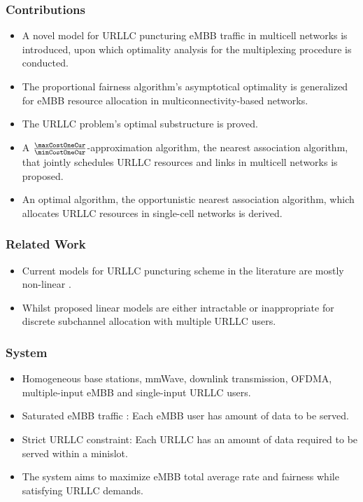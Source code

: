 \begin{frame}
  \frametitle{Contributions}
  \begin{itemize}
    \item A novel  model for URLLC puncturing eMBB traffic in multicell networks is introduced, upon which optimality analysis for the multiplexing procedure is conducted.
    \item The proportional fairness algorithm's asymptotical optimality \cite{KW02} is generalized for eMBB resource allocation in multiconnectivity-based networks.
    \item The URLLC problem's optimal substructure is proved.
    \item A $\frac{\maxCostOneCur}{\minCostOneCur}$-approximation algorithm, the nearest association algorithm, that jointly schedules URLLC resources and links in multicell networks is proposed.
    \item An optimal algorithm, the opportunistic nearest association algorithm, which allocates URLLC resources in single-cell networks is derived.
  \end{itemize}
\end{frame}

\begin{frame}
  \frametitle{Related Work}
  \begin{itemize}
    \item Current models for URLLC puncturing scheme in the literature are mostly non-linear \cite{BMATAMHH21}.
    \item Whilst proposed linear models are either intractable \cite{YZR21} or inappropriate \cite{AVS20} for discrete subchannel allocation with multiple URLLC users.
  \end{itemize}
\end{frame}

\begin{frame}
  \frametitle{System}
  \begin{itemize}
    \item Homogeneous base stations, mmWave, downlink transmission, OFDMA, multiple-input eMBB and single-input URLLC users.
    \item Saturated eMBB traffic \cite{S05}: Each eMBB user has  amount of data to be served.
    \item Strict URLLC constraint: Each URLLC has an amount of data required to be served within a minislot.
    \item The system aims to maximize eMBB total average rate and fairness while satisfying URLLC demands.
  \end{itemize}
\end{frame}

